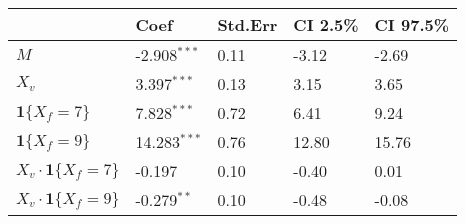 \begin{tabular}{lllll}
  \hline
 & Coef & Std.Err & CI 2.5\% & CI 97.5\% \\ 
  \hline
$M$ & -2.908$^{***}$ & 0.11 & -3.12 & -2.69 \\ 
  $X_v$ & 3.397$^{***}$ & 0.13 & 3.15 & 3.65 \\ 
  $\textbf{1}\{X_f = 7\}$ & 7.828$^{***}$ & 0.72 & 6.41 & 9.24 \\ 
  $\textbf{1}\{X_f = 9\}$ & 14.283$^{***}$ & 0.76 & 12.80 & 15.76 \\ 
  $X_v\cdot\textbf{1}\{X_f = 7\}$ & -0.197 & 0.10 & -0.40 & 0.01 \\ 
  $X_v\cdot\textbf{1}\{X_f = 9\}$ & -0.279$^{**}$ & 0.10 & -0.48 & -0.08 \\ 
   \hline
\end{tabular}

